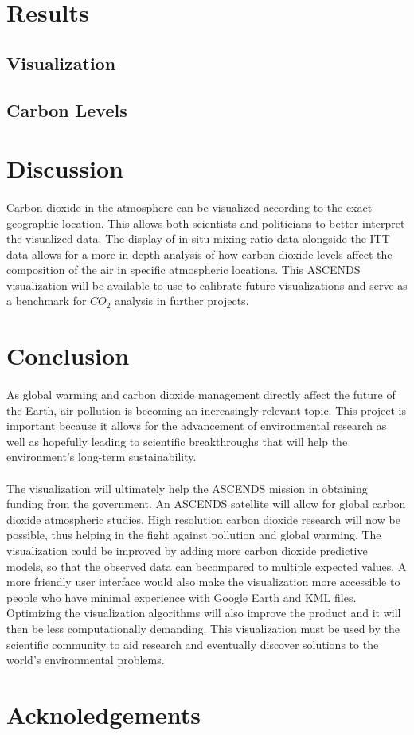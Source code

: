 \documentclass[12pt,letterpaper]{report}
\begin{document}
 \section*{Results}
  \subsection*{Visualization}
  \subsection*{Carbon Levels}

 \section*{Discussion}
  \paragraph{}
   Carbon dioxide in the atmosphere can be visualized according to the exact geographic location. This allows both scientists and politicians to better interpret the visualized data. The display of in-situ mixing ratio data alongside the ITT data allows for a more in-depth analysis of how carbon dioxide levels affect the composition of the air in specific atmospheric locations. This ASCENDS visualization will be available to use to calibrate future visualizations and serve as a benchmark for $CO_2$ analysis in further projects.
 \section*{Conclusion}
  \paragraph{}
   As global warming and carbon dioxide management directly affect the future of the Earth, air pollution is becoming an increasingly relevant topic.  This project is important because it allows for the advancement of environmental research as well as hopefully leading to scientific breakthroughs that will help the environment's long-term sustainability.
  \paragraph{}
   The visualization will ultimately help the ASCENDS mission in obtaining funding from the government.  An ASCENDS satellite will allow for global carbon dioxide atmospheric studies.  High resolution carbon dioxide research will now be possible, thus helping in the fight against pollution and global warming.  The visualization could be improved by adding more carbon dioxide predictive models, so that the observed data can becompared to multiple expected values.  A more friendly user interface would also make the visualization more accessible to people who have minimal experience with Google Earth and KML files.  Optimizing the visualization algorithms will also improve the product and it will then be less computationally demanding.  This visualization must be used by the scientific community to aid research and eventually discover solutions to the world's environmental problems.

 \section*{Acknoledgements}
\end{document}
